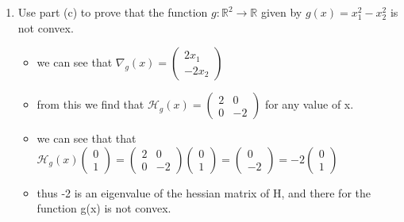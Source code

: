 \documentclass[12pt,twoside]{article}
\begin{document}
\begin{enumerate}[label=9.2]
\begin{enumerate}
\begin{itemize}
    \end{itemize}
    \item Use part (c) to prove that the function $g:\mathbb{R}^2
 \rightarrow \mathbb{R}$ given by $g(x) =x_1^2-x_2^2$
is not convex.
    \begin{itemize}
        \item we can see that $\nabla_{g}(x)=\begin{pmatrix} 2x_1\\-2x_2\end{pmatrix}$ 
        \item from this we find that $\mathcal{H}_{g}(x)=\begin{pmatrix}2&0\\0&-2\end{pmatrix}$ for any value of x. 
        \item we can see that that $\mathcal{H}_{g}(x)\begin{pmatrix}0\\1\end{pmatrix}=\begin{pmatrix}2&0\\0&-2\end{pmatrix}\begin{pmatrix}0\\1\end{pmatrix}=\begin{pmatrix}0\\-2\end{pmatrix}=-2\begin{pmatrix}0\\1\end{pmatrix}$ 
        \item thus -2 is an eigenvalue of the hessian matrix of H, and there for the function g(x) is not convex.
    \end{itemize}
\end{enumerate}



\end{enumerate}
\end{document}
